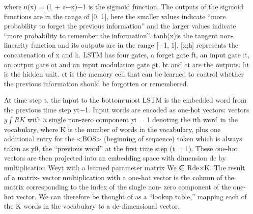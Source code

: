 {where σ(x) = (1 + e−x)−1 is the sigmoid function. The outputs of the sigmoid functions are in the range of [0, 1], here the smaller values indicate “more probability to forget the previous information” and the larger values indicate “more probability to remember the information”. tanh(x)is the tangent non-linearity function and its outputs are in the range [−1, 1]. [x;h] represents the concatenation of x and h. LSTM has four gates, a forget gate ft, an input gate it, an output gate ot and an input modulation gate gt. ht and ct are the outputs. ht is the hidden unit. ct is the memory cell that can be learned to control whether the previous information should be forgotten or remembered.


At time step t, the input to the bottom-most LSTM is the embedded word from the previous time step yt−1. Input words are encoded as one-hot vectors: vectors $y \int RK$ with a single non-zero component yi = 1 denoting the ith word in the vocabulary, where K is the number of words in the vocabulary, plus one additional entry for the <BOS> (beginning of sequence) token which is always taken as y0, the “previous word” at the first time step (t = 1). These one-hot vectors are then projected into an embedding space with dimension de by multiplication Weyt with a learned parameter matrix We ∈ Rde×K. The result of a matrix- vector multiplication with a one-hot vector is the column of the matrix corresponding to the index of the single non- zero component of the one-hot vector. We can therefore be thought of as a “lookup table,” mapping each of the K words in the vocabulary to a de-dimensional vector.
}


